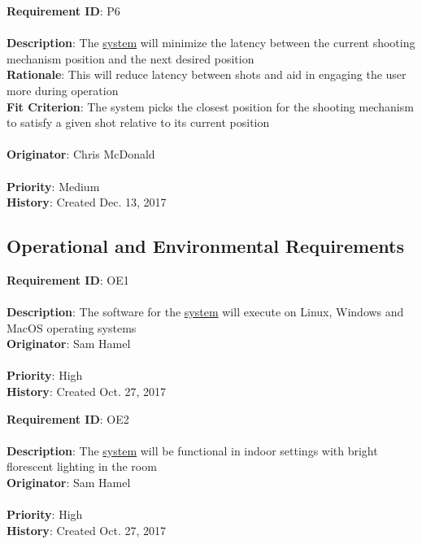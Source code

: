 \documentclass[11pt]{article}
\begin{document}
\begin{framed}
	\noindent\textbf{Requirement ID}: P6 \\\\
	\noindent\textbf{Description}: The \hyperref[sec:definitions]{system} will minimize the latency between the current shooting mechanism position and the next desired position \\
	\textbf{Rationale}: This will reduce latency between shots and aid in engaging the user more during operation \\
	\textbf{Fit Criterion}: The system picks the closest position for the shooting mechanism to satisfy a given shot relative to its current position \\\\
	\textbf{Originator}: Chris McDonald \\\\
	\textbf{Priority}: Medium \hfill \\
	\noindent\textbf{History}: Created Dec. 13, 2017
\end{framed}

\subsection{Operational and Environmental Requirements}
\begin{framed}
	\noindent\textbf{Requirement ID}: OE1 \hfill\\\\
	\noindent\textbf{Description}: The software for the \hyperref[sec:definitions]{system} will execute on Linux, Windows and MacOS operating systems \\
	\textbf{Originator}: Sam Hamel \\\\
	\textbf{Priority}: High \hfill \\
	\noindent\textbf{History}: Created Oct. 27, 2017
\end{framed}

\begin{framed}
	\noindent\textbf{Requirement ID}: OE2 \\\\
	\noindent\textbf{Description}: The \hyperref[sec:definitions]{system} will be functional in indoor settings with bright florescent lighting in the room \\
	\textbf{Originator}: Sam Hamel \\\\
	\textbf{Priority}: High \hfill \\
	\noindent\textbf{History}: Created Oct. 27, 2017
\end{framed}
\end{document}
